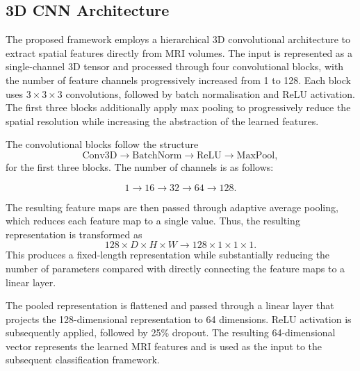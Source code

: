 \documentclass[10pt,twocolumn]{article}
\begin{document}
    \subsection{3D CNN Architecture}
       The proposed framework employs a hierarchical 3D convolutional
        architecture to extract spatial features directly from MRI volumes.
        The input is represented as a single-channel 3D tensor and processed
        through four convolutional blocks, with the number of feature channels
        progressively increased from 1 to 128. Each block uses
        $3\times3\times3$ convolutions, followed by batch
        normalisation and ReLU activation. The first three blocks additionally
        apply max pooling to progressively reduce the spatial resolution while
        increasing the abstraction of the learned features.

        \noindent
        The convolutional blocks follow the structure
        \[
        \mathrm{Conv3D}
        \rightarrow
        \mathrm{BatchNorm}
        \rightarrow
        \mathrm{ReLU}
        \rightarrow
        \mathrm{MaxPool},
        \]
        for the first three blocks. The number of channels is as follows:

        \[
        1 \rightarrow 16 \rightarrow 32 \rightarrow 64 \rightarrow 128.
        \]

        \noindent
        The resulting feature maps are then passed through adaptive average pooling, which reduces each feature map to a single value. Thus, the resulting representation is transformed as
        \[
        128\times D\times H\times W
        \rightarrow
        128\times1\times1\times1.
        \]
        \noindent
        This produces a fixed-length representation while substantially
        reducing the number of parameters compared with directly connecting
        the feature maps to a linear layer.

        \vspace{3pt}
        \noindent
        The pooled representation is flattened and passed through a linear
        layer that projects the 128-dimensional representation to 64
        dimensions. ReLU activation is subsequently applied, followed by
        25\% dropout. The resulting 64-dimensional vector represents the
        learned MRI features and is used as the input to the subsequent
        classification framework.
\end{document}
